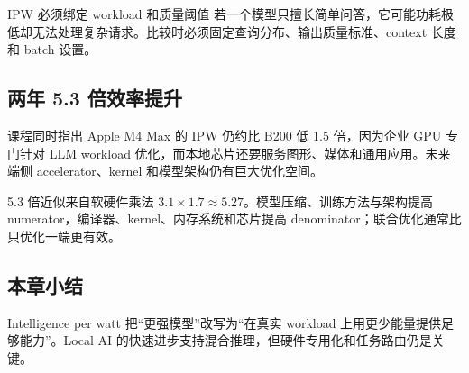 
\begin{warningbox}{IPW 必须绑定 workload 和质量阈值}
若一个模型只擅长简单问答，它可能功耗极低却无法处理复杂请求。比较时必须固定查询分布、输出质量标准、context 长度和 batch 设置。
\end{warningbox}

\subsection{两年 5.3 倍效率提升}


课程同时指出 Apple M4 Max 的 IPW 仍约比 B200 低 1.5 倍，因为企业 GPU 专门针对 LLM workload 优化，而本地芯片还要服务图形、媒体和通用应用。未来端侧 accelerator、kernel 和模型架构仍有巨大优化空间。

\begin{knowledgebox}{5.3 倍近似来自软硬件乘法}
$3.1\times1.7\approx5.27$。模型压缩、训练方法与架构提高 numerator，编译器、kernel、内存系统和芯片提高 denominator；联合优化通常比只优化一端更有效。
\end{knowledgebox}

\subsection{本章小结}

Intelligence per watt 把“更强模型”改写为“在真实 workload 上用更少能量提供足够能力”。Local AI 的快速进步支持混合推理，但硬件专用化和任务路由仍是关键。


